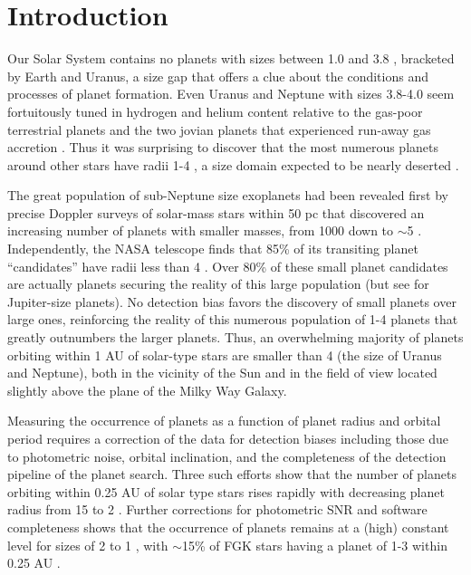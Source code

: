 \documentclass{emulateapj}
\begin{document}
\section{Introduction}
\label{sec:intro}
Our Solar System contains no planets with sizes between 1.0 and 3.8
\rearthe, bracketed by Earth and Uranus, a size gap that offers a clue
about the conditions and processes of planet formation. Even Uranus
and Neptune with sizes 3.8-4.0 \rearth seem fortuitously tuned in
hydrogen and helium content relative to the gas-poor terrestrial
planets and the two jovian planets that experienced run-away gas
accretion \citep{Goldreich2004, Morbidelli2013}.  Thus it was
surprising to discover that the most numerous planets around other
stars have radii 1-4 \rearth \citep{Borucki2010, Borucki2011,
  Batalha2013}, a size domain expected to be nearly deserted
\citep{Ida_Lin2010, Mordasini2012a}.

The great population of sub-Neptune size exoplanets had been revealed
first by precise Doppler surveys of solar-mass stars within 50 pc that
discovered an increasing number of planets with smaller masses, from
1000 \mearth down to $\sim$5 \mearth \citep{Howard2011d, Mayor2011}.
Independently, the NASA \ek telescope finds that 85\% of its
transiting planet ``candidates'' have radii less than 4 \rearth
\citep{Batalha2013}.  Over 80\% of these small planet candidates are
actually planets \citep{Morton_Johnson2011, Fressin2013} securing the
reality of this large population (but see \cite{Santerne2012} for
Jupiter-size planets).  No detection bias favors the discovery of
small planets over large ones, reinforcing the reality of this
numerous population of 1-4 \rearth planets that greatly outnumbers the
larger planets.  Thus, an overwhelming majority of planets orbiting
within 1 AU of solar-type stars are smaller than 4 \rearth (the size
of Uranus and Neptune), both in the vicinity of the Sun and in the \ek
field of view located slightly above the plane of the Milky Way
Galaxy.

Measuring the occurrence of planets as a function of planet radius and
orbital period requires a correction of the \ek data for detection
biases including those due to photometric noise, orbital inclination,
and the completeness of the detection pipeline of the \ek planet
search.  Three such efforts show that the number of planets orbiting
within 0.25 AU of solar type stars rises rapidly with decreasing
planet radius from 15 \rearth to 2 \rearth \citep{Howard2012,
  Fressin2013, Petigura2013}.  Further corrections for photometric SNR
and software completeness shows that the occurrence of planets remains
at a (high) constant level for sizes of 2 to 1 \rearthe, with
$\sim$15\% of FGK stars having a planet of 1-3 \rearth within 0.25 AU
\citep{Fressin2013, Petigura2013}.
\end{document}
